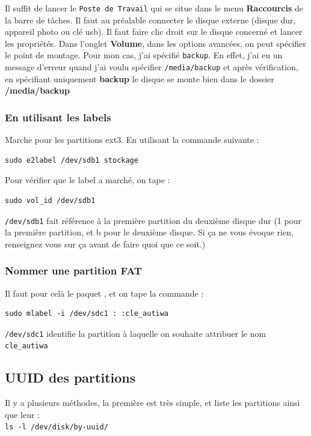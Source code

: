 \documentclass[a4paper,twoside]{article}
\begin{document}
Il suffit de lancer le \texttt{Poste de Travail} qui se situe dans le menu \textbf{Raccourcis} de la barre de tâches. Il faut au préalable connecter le disque externe (disque dur, appareil photo ou clé usb). Il faut faire clic droit sur le disque concerné et lancer les propriétés. Dans l'onglet \textbf{Volume}, dans les options avancées, on peut spécifier le point de montage. Pour mon cas, j'ai spécifié \texttt{backup}. En effet, j'ai eu un message d'erreur quand j'ai voulu spécifier \texttt{/media/backup} et après vérification, en spécifiant uniquement \textbf{backup} le disque se monte bien dans le dossier \textbf{/media/backup}

\subsubsection{En utilisant les labels}
Marche pour les partitions ext3. En utilisant la commande suivante :

\begin{verbatim}
sudo e2label /dev/sdb1 stockage
\end{verbatim}

Pour vérifier que le label a marché, on tape :

\begin{verbatim}
sudo vol_id /dev/sdb1
\end{verbatim}

\begin{remarque}
\texttt{/dev/sdb1} fait référence à la première partition du deuxième disque dur (1 pour la première partition, et b pour le deuxième disque. Si ça ne vous évoque rien, renseignez vous sur ça avant de faire quoi que ce soit.)
\end{remarque}

\subsubsection{Nommer une partition FAT}
Il faut pour celà le paquet , et on tape la commande :

\begin{verbatim}
sudo mlabel -i /dev/sdc1 : :cle_autiwa
\end{verbatim}

\texttt{/dev/sdc1} identifie la partition à laquelle on souhaite attribuer le nom \texttt{cle\_autiwa}

\subsection{UUID des partitions}
Il y a plusieurs méthodes, la première est très simple, et liste les partitions ainsi que leur  :\\
\verb|ls -l /dev/disk/by-uuid/|
\end{document}
